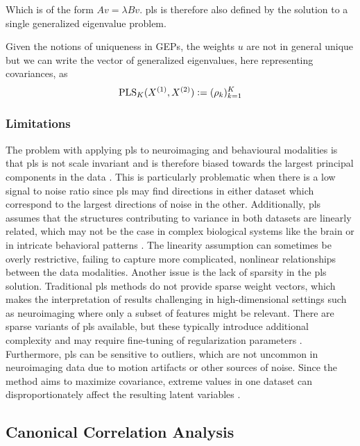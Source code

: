Which is of the form $A v = \lambda B v$. \acrshort{pls} is therefore also defined by the solution to a single generalized eigenvalue problem.

Given the notions of uniqueness in GEPs, the weights $u$ are not in general unique but we can write the vector of generalized eigenvalues, here representing covariances, as
\begin{align}
    \label{eq:pls-vector-of-correlations-def}
    \operatorname{PLS}_K(X^{(1)},X^{(2)}) \vcentcolon= (\rho_k)_{k=1}^K
\end{align}

\subsubsection{Limitations} The problem with applying \acrshort{pls} to neuroimaging and behavioural modalities is that \acrshort{pls} is not scale invariant and
is therefore biased towards the largest principal components in the data \citep{helmer2020stability}.
This is particularly problematic when there is a low signal to noise ratio since \acrshort{pls} may find directions in either dataset which correspond to the largest directions of noise in the other.
Additionally, \acrshort{pls} assumes that the structures contributing to variance in both datasets are linearly related, which
may not be the case in complex biological systems like the brain or in intricate behavioral patterns \citep{rosipal2005overview}.
The linearity assumption can sometimes be overly restrictive, failing to capture more complicated, nonlinear relationships between the data modalities.
Another issue is the lack of sparsity in the \acrshort{pls} solution.
Traditional \acrshort{pls} methods do not provide sparse weight vectors, which makes the interpretation of results challenging in high-dimensional settings such as neuroimaging where only a subset of features might be relevant.
There are sparse variants of \acrshort{pls} available, but these typically introduce additional complexity and may require fine-tuning of regularization parameters \citep{chun2010sparse, witten2009penalized}.
Furthermore, \acrshort{pls} can be sensitive to outliers, which are not uncommon in neuroimaging data due to motion artifacts or other sources of noise.
Since the method aims to maximize covariance, extreme values in one dataset can disproportionately affect the resulting latent variables \citep{Wold1973}.

\subsection{Canonical Correlation Analysis}\label{sec:cca}

